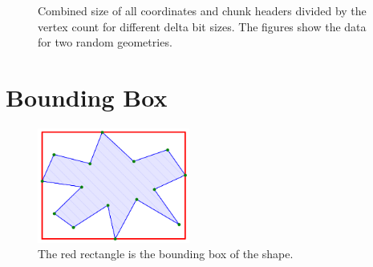 \begin{figure}[htbp]%
    \centering
    \qquad
    \caption{Combined size of all coordinates and chunk headers divided by the vertex count for different delta bit sizes. The figures show the data for two random geometries.}%
    \label{fig:preiteration}%
\end{figure}


\section{Bounding Box}\label{boundingbox}
\begin{figure}[htbp]
    \centering
    \includegraphics[width=5cm]{images/bbox_example.png}
    \caption{The red rectangle is the bounding box of the shape.}
    \label{fig:bboxexample}
\end{figure}

